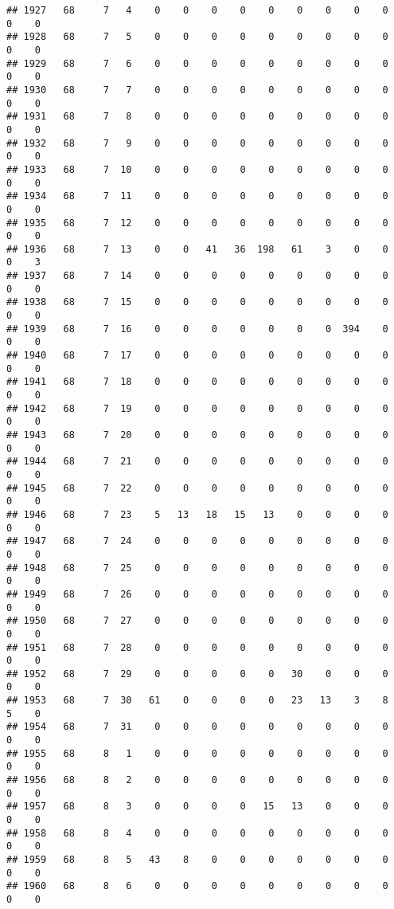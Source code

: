 \documentclass[]{article}
\begin{document}
\begin{verbatim}
## 1927   68     7   4    0    0    0    0    0    0    0    0    0    0    0
## 1928   68     7   5    0    0    0    0    0    0    0    0    0    0    0
## 1929   68     7   6    0    0    0    0    0    0    0    0    0    0    0
## 1930   68     7   7    0    0    0    0    0    0    0    0    0    0    0
## 1931   68     7   8    0    0    0    0    0    0    0    0    0    0    0
## 1932   68     7   9    0    0    0    0    0    0    0    0    0    0    0
## 1933   68     7  10    0    0    0    0    0    0    0    0    0    0    0
## 1934   68     7  11    0    0    0    0    0    0    0    0    0    0    0
## 1935   68     7  12    0    0    0    0    0    0    0    0    0    0    0
## 1936   68     7  13    0    0   41   36  198   61    3    0    0    0    3
## 1937   68     7  14    0    0    0    0    0    0    0    0    0    0    0
## 1938   68     7  15    0    0    0    0    0    0    0    0    0    0    0
## 1939   68     7  16    0    0    0    0    0    0    0  394    0    0    0
## 1940   68     7  17    0    0    0    0    0    0    0    0    0    0    0
## 1941   68     7  18    0    0    0    0    0    0    0    0    0    0    0
## 1942   68     7  19    0    0    0    0    0    0    0    0    0    0    0
## 1943   68     7  20    0    0    0    0    0    0    0    0    0    0    0
## 1944   68     7  21    0    0    0    0    0    0    0    0    0    0    0
## 1945   68     7  22    0    0    0    0    0    0    0    0    0    0    0
## 1946   68     7  23    5   13   18   15   13    0    0    0    0    0    0
## 1947   68     7  24    0    0    0    0    0    0    0    0    0    0    0
## 1948   68     7  25    0    0    0    0    0    0    0    0    0    0    0
## 1949   68     7  26    0    0    0    0    0    0    0    0    0    0    0
## 1950   68     7  27    0    0    0    0    0    0    0    0    0    0    0
## 1951   68     7  28    0    0    0    0    0    0    0    0    0    0    0
## 1952   68     7  29    0    0    0    0    0   30    0    0    0    0    0
## 1953   68     7  30   61    0    0    0    0   23   13    3    8    5    0
## 1954   68     7  31    0    0    0    0    0    0    0    0    0    0    0
## 1955   68     8   1    0    0    0    0    0    0    0    0    0    0    0
## 1956   68     8   2    0    0    0    0    0    0    0    0    0    0    0
## 1957   68     8   3    0    0    0    0   15   13    0    0    0    0    0
## 1958   68     8   4    0    0    0    0    0    0    0    0    0    0    0
## 1959   68     8   5   43    8    0    0    0    0    0    0    0    0    0
## 1960   68     8   6    0    0    0    0    0    0    0    0    0    0    0

\end{verbatim}
\end{document}
